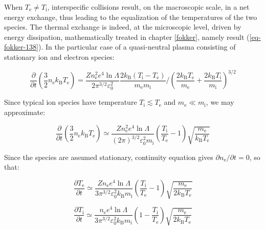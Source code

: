 When $T_\text{e}\neq T_\mathrm{i}$, interspecific collisions result, on the macroscopic scale, in a net energy exchange, thus leading to the equalization of the temperatures of the two species. The thermal exchange is indeed, at the microscopic level, driven by energy dissipation, mathematically treated in chapter \ref{fokker}, namely result (\ref{eq-fokker-138}). In the particular case of a quasi-neutral plasma consisting of stationary ion and electron species:

\begin{equation}
    \frac{\partial}{\partial t}\left(\frac{3}{2}n_\text{e} k_\mathrm{B}T_\text{e}\right)=\frac{Zn_\text{e}^2e^4\ln{\Lambda}}{2\pi^{3/2}\varepsilon_0^2}\frac{2k_\mathrm{B}(T_\mathrm{i}-T_\text{e})}{m_\text{e}m_\mathrm{i}}\bigg/\left(\frac{2k_\mathrm{B}T_\text{e}}{m_\text{e}}+\frac{2k_\mathrm{B}T_\mathrm{i}}{m_\mathrm{i}}\right)^{3/2}
\end{equation}

Since typical ion species have temperature $T_\mathrm{i}\lesssim T_\text{e}$ and $m_\text{e}\ll m_\mathrm{i}$, we may approximate:

\begin{equation*}
    \frac{\partial}{\partial t}\left(\frac{3}{2}n_\text{e} k_\mathrm{B}T_\text{e}\right)\simeq\frac{Zn_\text{e}^2e^4\ln{\Lambda}}{(2\pi)^{3/2}\varepsilon_0^2m_\mathrm{i}}\left(\frac{T_\mathrm{i}}{T_\text{e}}-1\right)\sqrt{\frac{m_\text{e}}{k_\mathrm{B}T_\text{e}}}
\end{equation*}

Since the species are assumed stationary, continuity equation gives $\partial n_\text{e}/\partial t=0$, so that:

\begin{equation*}
    \frac{\partial T_\text{e}}{\partial t}\simeq\frac{Zn_\text{e}e^4\ln{\Lambda}}{3\pi^{3/2}\varepsilon_0^2k_\mathrm{B}m_\mathrm{i}}\left(\frac{T_\mathrm{i}}{T_\text{e}}-1\right)\sqrt{\frac{m_\text{e}}{2k_\mathrm{B}T_\text{e}}}
\end{equation*}

\begin{equation*}
    \frac{\partial T_\mathrm{i}}{\partial t}\simeq\frac{n_\text{e}e^4\ln{\Lambda}}{3\pi^{3/2}\varepsilon_0^2k_\mathrm{B}m_\mathrm{i}}\left(1-\frac{T_\mathrm{i}}{T_\text{e}}\right)\sqrt{\frac{m_\text{e}}{2k_\mathrm{B}T_\text{e}}}
\end{equation*}
